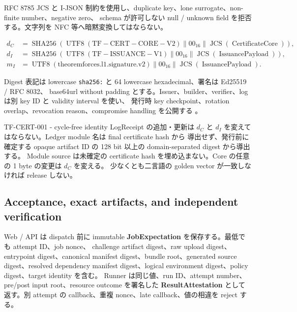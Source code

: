 \documentclass[a4paper,11pt]{ltjsarticle}
\newcommand{\term}[1]{\textbf{\color{TFNavy}#1}}
\newcommand{\code}[1]{\texttt{#1}}
\begin{document}
RFC 8785 JCS と I-JSON 制約を使用し、duplicate key、lone surrogate、non-finite number、negative zero、
schema が許可しない null / unknown field を拒否する。文字列を NFC 等へ暗黙変換してはならない。

\begin{align}
d_C &= \operatorname{SHA256}(\operatorname{UTF8}(\mathrm{TF\!\! -\! CERT\!\! -\! CORE\!\! -\! V2})\parallel 00_{16}\parallel
      \operatorname{JCS}(\operatorname{CertificateCore})),\\
d_I &= \operatorname{SHA256}(\operatorname{UTF8}(\mathrm{TF\!\! -\! ISSUANCE\!\! -\! V1})\parallel 00_{16}\parallel
      \operatorname{JCS}(\operatorname{IssuancePayload})),\\
m_I &= \operatorname{UTF8}(\mathrm{theoremforces.l1.signature.v2})\parallel 00_{16}\parallel
      \operatorname{JCS}(\operatorname{IssuancePayload}).
\end{align}

Digest 表記は lowercase \code{sha256:} と 64 lowercase hexadecimal、署名は Ed25519 / RFC 8032、
base64url without padding とする。Issuer、builder、verifier、log は別 key ID と validity interval を使い、
発行時 key checkpoint、rotation overlap、revocation reason、compromise handling を公開する
\cite{rfc8785,rfc8032}。

\begin{principlebox}{TF-CERT-001 - cycle-free identity}
LogReceipt の追加・更新は $d_C$ と $d_I$ を変えてはならない。Ledger module 名は final certificate hash から
導出せず、発行前に確定する opaque artifact ID の 128 bit 以上の domain-separated digest から導出する。
Module source は未確定の certificate hash を埋め込まない。Core の任意の 1 byte の変更は $d_C$ を変える。
少なくとも二言語の golden vector が一致しなければ release しない。
\end{principlebox}

\subsection{Acceptance, exact artifacts, and independent verification}

Web / API は dispatch 前に immutable \term{JobExpectation} を保存する。最低でも attempt ID、job nonce、
challenge artifact digest、raw upload digest、entrypoint digest、canonical manifest digest、bundle root、generated source
digest、resolved dependency manifest digest、logical environment digest、policy digest、target identity を含む。
Runner は同じ値、run ID、attempt number、pre/post input root、resource outcome を署名した
\term{ResultAttestation} として返す。別 attempt の callback、重複 nonce、late callback、値の相違を reject する。
\end{document}
